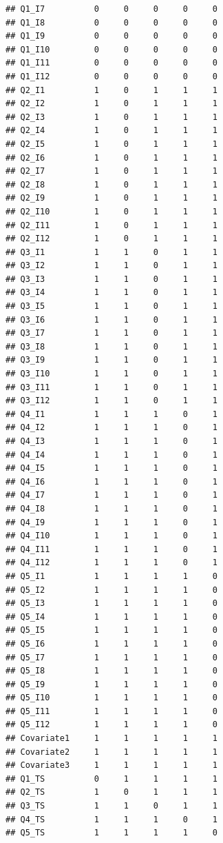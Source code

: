 \documentclass[
]{book}
\begin{document}
\begin{verbatim}
## Q1_I7          0     0     0     0     0
## Q1_I8          0     0     0     0     0
## Q1_I9          0     0     0     0     0
## Q1_I10         0     0     0     0     0
## Q1_I11         0     0     0     0     0
## Q1_I12         0     0     0     0     0
## Q2_I1          1     0     1     1     1
## Q2_I2          1     0     1     1     1
## Q2_I3          1     0     1     1     1
## Q2_I4          1     0     1     1     1
## Q2_I5          1     0     1     1     1
## Q2_I6          1     0     1     1     1
## Q2_I7          1     0     1     1     1
## Q2_I8          1     0     1     1     1
## Q2_I9          1     0     1     1     1
## Q2_I10         1     0     1     1     1
## Q2_I11         1     0     1     1     1
## Q2_I12         1     0     1     1     1
## Q3_I1          1     1     0     1     1
## Q3_I2          1     1     0     1     1
## Q3_I3          1     1     0     1     1
## Q3_I4          1     1     0     1     1
## Q3_I5          1     1     0     1     1
## Q3_I6          1     1     0     1     1
## Q3_I7          1     1     0     1     1
## Q3_I8          1     1     0     1     1
## Q3_I9          1     1     0     1     1
## Q3_I10         1     1     0     1     1
## Q3_I11         1     1     0     1     1
## Q3_I12         1     1     0     1     1
## Q4_I1          1     1     1     0     1
## Q4_I2          1     1     1     0     1
## Q4_I3          1     1     1     0     1
## Q4_I4          1     1     1     0     1
## Q4_I5          1     1     1     0     1
## Q4_I6          1     1     1     0     1
## Q4_I7          1     1     1     0     1
## Q4_I8          1     1     1     0     1
## Q4_I9          1     1     1     0     1
## Q4_I10         1     1     1     0     1
## Q4_I11         1     1     1     0     1
## Q4_I12         1     1     1     0     1
## Q5_I1          1     1     1     1     0
## Q5_I2          1     1     1     1     0
## Q5_I3          1     1     1     1     0
## Q5_I4          1     1     1     1     0
## Q5_I5          1     1     1     1     0
## Q5_I6          1     1     1     1     0
## Q5_I7          1     1     1     1     0
## Q5_I8          1     1     1     1     0
## Q5_I9          1     1     1     1     0
## Q5_I10         1     1     1     1     0
## Q5_I11         1     1     1     1     0
## Q5_I12         1     1     1     1     0
## Covariate1     1     1     1     1     1
## Covariate2     1     1     1     1     1
## Covariate3     1     1     1     1     1
## Q1_TS          0     1     1     1     1
## Q2_TS          1     0     1     1     1
## Q3_TS          1     1     0     1     1
## Q4_TS          1     1     1     0     1
## Q5_TS          1     1     1     1     0
\end{verbatim}
\end{document}
